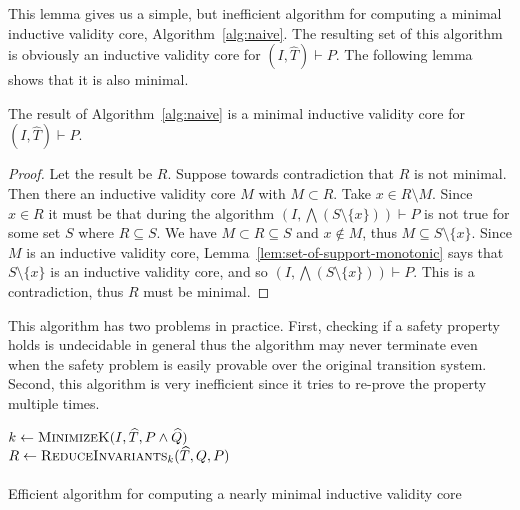 This lemma gives us a simple, but inefficient algorithm for computing
a minimal inductive validity core, Algorithm~\ref{alg:naive}. The resulting set
of this algorithm is obviously an inductive validity core for $(I, \widehat
T)\vdash P$. The following lemma shows that it is also minimal.

\begin{lemma}
  The result of Algorithm~\ref{alg:naive} is a minimal inductive validity core
  for $(I, \widehat T)\vdash P$.
\end{lemma}
\begin{proof}
  Let the result be $R$. Suppose towards contradiction that $R$ is not
  minimal. Then there an inductive validity core $M$ with $M \subset R$. Take $x
  \in R\setminus M$. Since $x \in R$ it must be that during the
  algorithm $(I, \bigwedge(S\setminus\{x\}))\vdash P$ is not true for
  some set $S$ where $R \subseteq S$. We have $M \subset R \subseteq
  S$ and $x\not\in M$, thus $M \subseteq S\setminus \{x\}$. Since $M$
  is an inductive validity core, Lemma~\ref{lem:set-of-support-monotonic} says
  that $S\setminus \{x\}$ is an inductive validity core, and so $(I, \bigwedge
  (S\setminus\{x\}))\vdash P$. This is a contradiction, thus $R$ must
  be minimal.
\end{proof}

This algorithm has two problems in practice. First, checking if a
safety property holds is undecidable in general thus the algorithm may
never terminate even when the safety problem is easily provable over
the original transition system. Second, this algorithm is very
inefficient since it tries to re-prove the property multiple times.

\begin{algorithm}[t]
  \BlankLine
  $k \leftarrow \textsc{MinimizeK}(I, \widehat T, P \land \widehat Q)$ \\
  $R \leftarrow \textsc{ReduceInvariants}_k(\widehat T, Q, P)$ \\
  \\
\caption{Efficient algorithm for computing a nearly minimal inductive validity core}
\label{alg:set-of-support}
\end{algorithm}

